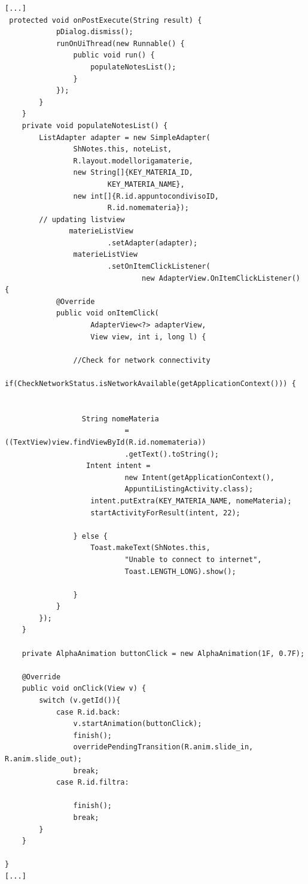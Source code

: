 \documentclass[a4paper, 50pt, twoside]{article}
\begin{document}
\begin{lstlisting}
[...]
 protected void onPostExecute(String result) {
            pDialog.dismiss();
            runOnUiThread(new Runnable() {
                public void run() {
                    populateNotesList();
                }
            });
        }
    }
    private void populateNotesList() {
        ListAdapter adapter = new SimpleAdapter(
                ShNotes.this, noteList,
                R.layout.modellorigamaterie,
                new String[]{KEY_MATERIA_ID,
                        KEY_MATERIA_NAME},
                new int[]{R.id.appuntocondivisoID,
                        R.id.nomemateria});
        // updating listview
               materieListView
                        .setAdapter(adapter);
                materieListView
                        .setOnItemClickListener(
                                new AdapterView.OnItemClickListener() {
            @Override
            public void onItemClick(
                    AdapterView<?> adapterView,
                    View view, int i, long l) {

                //Check for network connectivity
                if(CheckNetworkStatus.isNetworkAvailable(getApplicationContext())) {


                  String nomeMateria 
                            = ((TextView)view.findViewById(R.id.nomemateria))
                            .getText().toString();
                   Intent intent = 
                            new Intent(getApplicationContext(),
                            AppuntiListingActivity.class);
                    intent.putExtra(KEY_MATERIA_NAME, nomeMateria);
                    startActivityForResult(intent, 22);

                } else {
                    Toast.makeText(ShNotes.this,
                            "Unable to connect to internet",
                            Toast.LENGTH_LONG).show();

                }
            }
        });
    }

    private AlphaAnimation buttonClick = new AlphaAnimation(1F, 0.7F);

    @Override
    public void onClick(View v) {
        switch (v.getId()){
            case R.id.back:
                v.startAnimation(buttonClick);
                finish();
                overridePendingTransition(R.anim.slide_in, R.anim.slide_out);
                break;
            case R.id.filtra:

                finish();
                break;
        }
    }

}
[...]
\end{lstlisting}
\end{document}
